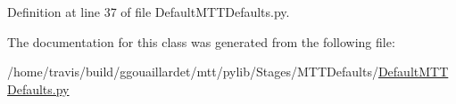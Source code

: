 Definition at line 37 of file Default\-M\-T\-T\-Defaults.\-py.



The documentation for this class was generated from the following file\-:\begin{DoxyCompactItemize}
\item 
/home/travis/build/ggouaillardet/mtt/pylib/\-Stages/\-M\-T\-T\-Defaults/\hyperlink{DefaultMTTDefaults_8py}{Default\-M\-T\-T\-Defaults.\-py}\end{DoxyCompactItemize}
